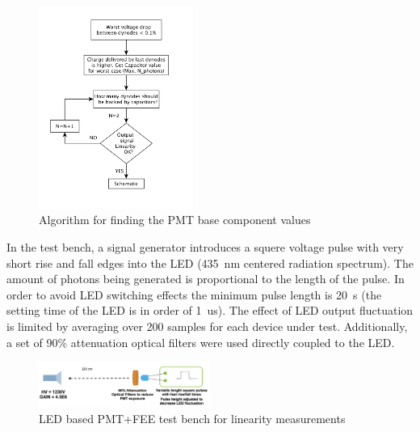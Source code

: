 \documentclass[a4paper, 10pt, oneside, twocolumn, 3p]{elsarticle}
\begin{document}
\begin{figure}
  \begin{center}
    \includegraphics[width=0.45\textwidth]{./figures/diagrama.png}
    \caption{Algorithm for finding the PMT base component values}
    \label{fig:Base_Sizing}
  \end{center}
\end{figure}


\par In the test bench, a signal generator introduces a squere voltage pulse with very short rise and fall edges into the LED (435~nm centered radiation spectrum). The amount of photons being generated is proportional to the length of the pulse. In order to avoid LED switching effects the minimum pulse length is 20~\textmu s (the setting time of the LED is in order of 1~us). The effect of LED output fluctuation is limited by averaging over 200 samples for each device under test. Additionally, a set of 90\% attenuation optical filters were used directly coupled to the LED.

\begin{figure}[H]
	\begin{center}
		\includegraphics[width=0.5\textwidth]{./figures/LED_testbench1.png}
		\caption{LED based PMT+FEE test bench for linearity measurements}
		\label{fig:LED_testbench}
	\end{center}
\end{figure}
\end{document}
